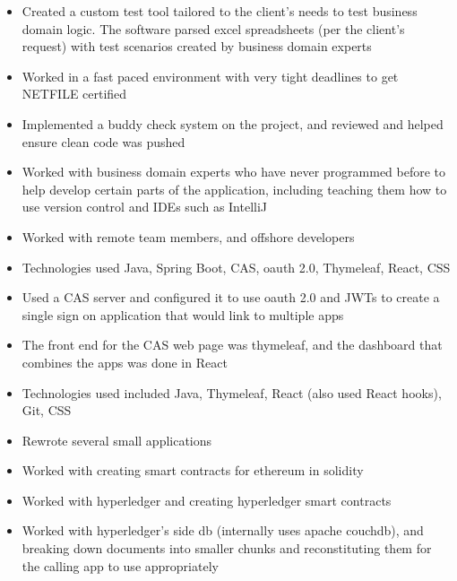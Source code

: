\begin{cventries}
{\begin{cvitems}
{\begin{itemize}
                    \item {Created a custom test tool tailored to the client’s needs to test business domain logic. The software parsed excel spreadsheets
                            (per the client’s request) with test scenarios created by business domain experts}
                    \item {Worked in a fast paced environment with very tight deadlines to get NETFILE certified}
                    \item {Implemented a buddy check system on the project, and reviewed and helped ensure clean code was pushed}
                    \item {Worked with business domain experts who have never programmed before to help develop certain parts of the application, including teaching them how to use version control and IDEs such as IntelliJ}
                    \item {Worked with remote team members, and offshore developers}
                \end{itemize}
            }
            \item[] {
                \begin{itemize}
                    \item {Technologies used Java, Spring Boot, CAS, oauth 2.0, Thymeleaf, React, CSS}
                    \item {Used a CAS server and configured it to use oauth 2.0 and JWTs to create a single sign on application that would link to multiple apps}
                    \item {The front end for the CAS web page was thymeleaf, and the dashboard that combines the apps was done in React}
                \end{itemize}
            }
            \item[] {
                \begin{itemize}
                    \item {Technologies used included Java, Thymeleaf, React (also used React hooks), Git, CSS}
                    \item {Rewrote several small applications}
                \end{itemize}
            }
            \item[] {
                \begin{itemize}
                    \item {Worked with creating smart contracts for ethereum in solidity}
                    \item {Worked with hyperledger and creating hyperledger smart contracts}
                    \item {Worked with hyperledger's side db (internally uses apache couchdb),
                        and breaking down documents into smaller chunks and reconstituting them for the calling app to use appropriately}
                \end{itemize}
            }
        \end{cvitems}
    }


\end{cventries}
